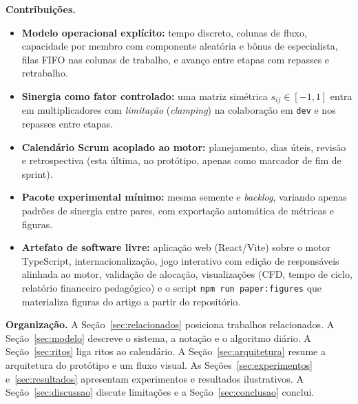 \textbf{Contribuições.}
\begin{itemize}
  \item \textbf{Modelo operacional explícito:} tempo discreto, colunas de fluxo, capacidade por membro com componente aleatória e bônus de especialista, filas FIFO nas colunas de trabalho, e avanço entre etapas com repasses e retrabalho.
  \item \textbf{Sinergia como fator controlado:} uma matriz simétrica $s_{ij}\in[-1,1]$ entra em multiplicadores com \emph{limitação} (\emph{clamping}) na colaboração em \texttt{dev} e nos repasses entre etapas.
  \item \textbf{Calendário Scrum acoplado ao motor:} planejamento, dias úteis, revisão e retrospectiva (esta última, no protótipo, apenas como marcador de fim de sprint).
  \item \textbf{Pacote experimental mínimo:} mesma semente e \emph{backlog}, variando apenas padrões de sinergia entre pares, com exportação automática de métricas e figuras.
  \item \textbf{Artefato de software livre:} aplicação web (React/Vite) sobre o motor TypeScript, internacionalização, jogo interativo com edição de responsáveis alinhada ao motor, validação de alocação, visualizações (CFD, tempo de ciclo, relatório financeiro pedagógico) e o script \texttt{npm run paper:figures} que materializa figuras do artigo a partir do repositório.
\end{itemize}

\textbf{Organização.} A Seção~\ref{sec:relacionados} posiciona trabalhos relacionados. A Seção~\ref{sec:modelo} descreve o sistema, a notação e o algoritmo diário. A Seção~\ref{sec:ritos} liga ritos ao calendário. A Seção~\ref{sec:arquitetura} resume a arquitetura do protótipo e um fluxo visual. As Seções~\ref{sec:experimentos} e~\ref{sec:resultados} apresentam experimentos e resultados ilustrativos. A Seção~\ref{sec:discussao} discute limitações e a Seção~\ref{sec:conclusao} conclui.
